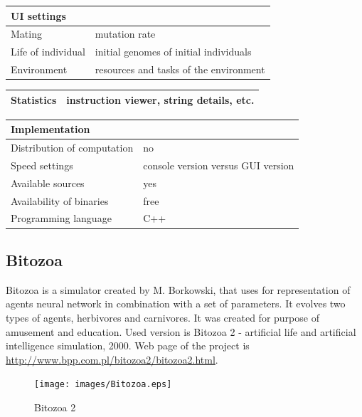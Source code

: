 \documentclass[a4paper,12pt]{report}
\begin{document}
\vspace{10pt}
\begin{tabular} {|p{150pt}|p{220pt}|}\hline \textbf{UI settings}& \\ \hline
Mating&mutation rate \\ \hline
Life of individual&initial genomes of initial individuals \\ \hline
Environment&resources and tasks of the environment \\ \hline 
\end{tabular} 

\vspace{10pt}
\begin{tabular} {|p{150pt}|p{220pt}|}\hline \textbf{Statistics}&instruction viewer, string details, etc. \\ \hline
\end{tabular} 

\vspace{10pt}
\begin{tabular}{|p{150pt}|p{220pt}|} \hline \textbf{Implementation}& \\ \hline
Distribution of computation&no \\ \hline
Speed settings&console version versus GUI version  \\ \hline
Available sources&yes \\ \hline
Availability of binaries&free \\ \hline
Programming language&C++ \\ \hline
\end{tabular}


\subsection {Bitozoa}
Bitozoa is a simulator created by M. Borkowski, that uses for representation of agents neural network in combination with a set of parameters. It evolves two types of agents, herbivores and carnivores. It was created for purpose of amusement and education. Used version is Bitozoa 2 - artificial life and artificial intelligence simulation, 2000. Web page of the project is \url{http://www.bpp.com.pl/bitozoa2/bitozoa2.html}.

\begin{figure}
\begin{center}
  \texttt{[image: images/Bitozoa.eps]}
  \caption{Bitozoa 2}
  \label{img.Bitozoa}
\end{center}
\end{figure}
\end{document}

